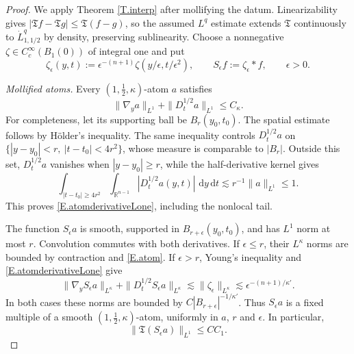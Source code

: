 \documentclass[12pt,leqno]{amsart}
\numberwithin{equation}{section}
\newcommand{\R}{\mathbb R}
\newcommand{\dhalf}{D_t^{1/2}}
\renewcommand{\d}{\,\mathrm d}
\theoremstyle{plain}
\theoremstyle{remark}
\begin{document}
\begin{proof}
We apply Theorem \ref{T.interp} after mollifying the datum. Linearizability
gives $|\mathfrak Tf-\mathfrak Tg|\le\mathfrak T(f-g)$, so the assumed
$L^q$ estimate extends $\mathfrak T$ continuously to
$\dot L^q_{1,1/2}$ by density, preserving sublinearity.
Choose a nonnegative $\zeta\in C_c^\infty(B_1(0))$ of integral one and put
\[
 \zeta_\epsilon(y,t):=\epsilon^{-(n+1)}
       \zeta(y/\epsilon,t/\epsilon^2),\qquad
 S_\epsilon f:=\zeta_\epsilon*f,\qquad \epsilon>0.
\]
\medskip

\noindent\emph{Mollified atoms.} Every $(1,\tfrac12,\kappa)$-atom $a$ satisfies
\begin{equation}\label{E.atomderivativeLone}
 \|\nabla_y a\|_{L^1}+\|\dhalf a\|_{L^1}\le C_\kappa.
\end{equation}
For completeness, let its supporting ball be $B_r(y_0,t_0)$. The spatial
estimate follows by H\"older's inequality. The same inequality controls
$\dhalf a$ on $\{|y-y_0|<r,\ |t-t_0|<4r^2\}$, whose measure is comparable
to $|B_r|$. Outside this set, $\dhalf a$ vanishes when $|y-y_0|\ge r$,
while the half-derivative kernel gives
\[
 \int_{|t-t_0|\ge4r^2}\int_{\R^{n-1}}|\dhalf a(y,t)|\,\d y\d t
 \lesssim r^{-1}\|a\|_{L^1}\le1.
\]
This proves \eqref{E.atomderivativeLone}, including the nonlocal tail.

The function $S_\epsilon a$ is smooth, supported in $B_{r+\epsilon}(y_0,t_0)$,
and has $L^1$ norm at most $r$. Convolution commutes with both derivatives.
If $\epsilon\le r$, their $L^\kappa$ norms are bounded by contraction and
\eqref{E.atom}. If $\epsilon>r$, Young's inequality and
\eqref{E.atomderivativeLone} give
\[
 \|\nabla_y S_\epsilon a\|_{L^\kappa}
 +\|\dhalf S_\epsilon a\|_{L^\kappa}
 \lesssim\|\zeta_\epsilon\|_{L^\kappa}
 \lesssim\epsilon^{-(n+1)/\kappa'}.
\]
In both cases these norms are bounded by
$C|B_{r+\epsilon}|^{-1/\kappa'}$. Thus $S_\epsilon a$ is a fixed multiple
of a smooth $(1,\tfrac12,\kappa)$-atom, uniformly in $a$, $r$ and
$\epsilon$. In particular,
\begin{equation}\label{E.mollifiedatomendpoint}
 \|\mathfrak T(S_\epsilon a)\|_{L^1}\le C C_1.
\end{equation}
\medskip


\end{proof}
\end{document}
